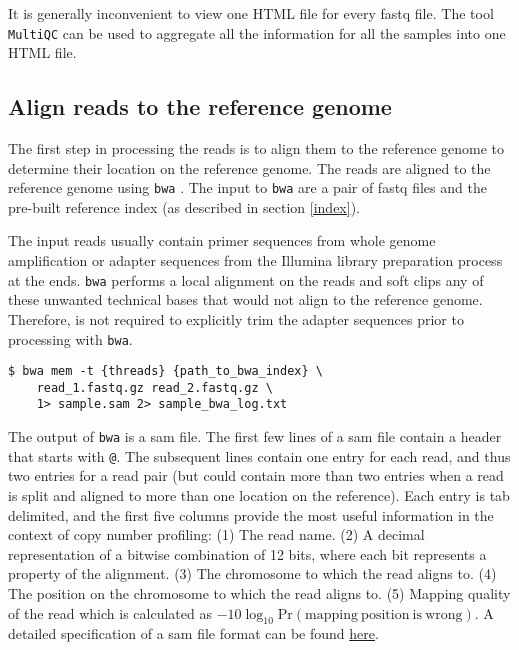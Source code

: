 \documentclass[11pt]{article}
\newcommand{\prog}[1]{\texttt{#1}}
\begin{document}
It is generally inconvenient to view one HTML file for every fastq
file. The tool \prog{MultiQC} can be used to aggregate all the
information for all the samples into one HTML file.

\subsection{Align reads to the reference genome}
The first step in processing the reads is to align them to the reference
genome to determine their location on the reference genome.
The reads are aligned to the reference genome using \prog{bwa}
\citep{li2013aligning}.
The input to \prog{bwa} are a pair of fastq files and the pre-built
reference index (as described in section \ref{index}).

The input reads usually contain primer sequences from whole genome
amplification or adapter sequences from the Illumina library preparation
process at the ends. \prog{bwa} performs a local alignment on the reads
and soft clips any of these unwanted technical bases that would not
align to the reference genome. Therefore, is not required to explicitly
trim the adapter sequences prior to processing with \prog{bwa}.

\begin{verbatim}
$ bwa mem -t {threads} {path_to_bwa_index} \
    read_1.fastq.gz read_2.fastq.gz \
    1> sample.sam 2> sample_bwa_log.txt
\end{verbatim}

The output of \prog{bwa} is a sam file. The first few lines of a sam
file contain a header that starts with \texttt{@}. The subsequent
lines contain one entry for each read, and thus two entries for a read
pair (but could contain more than two entries when a read is split and
aligned to more than one location on the reference).
%
Each entry is tab delimited, and the first five columns provide the
most useful information in the context of copy number profiling: (1) The
read name. (2) A decimal representation of a bitwise combination of 12
bits, where each bit represents a property of the alignment. (3) The
chromosome to which the read aligns to. (4) The position on the
chromosome to which the read aligns to. (5) Mapping quality of the read
which is calculated as $-10 \log_{10} \mathrm{Pr(mapping\ position\ is
\ wrong)}$.
%
A detailed specification of a sam file format can be found
\href{https://samtools.github.io/hts-specs/SAMv1.pdf}{here}.
\end{document}
